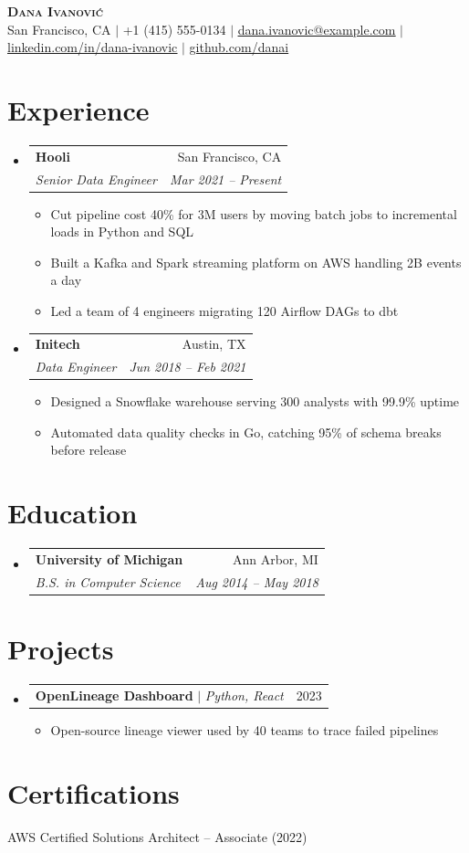 \documentclass[letterpaper,11pt]{article}
\makeatletter
\newcommand{\resumeItem}[1]{\item\small{{#1 \vspace{-2pt}}}}
\newcommand{\resumeSubheading}[4]{
  \vspace{-2pt}\item
    \begin{tabular*}{0.97\textwidth}[t]{l@{\extracolsep{\fill}}r}
      \textbf{#1} & #2 \\
      \textit{\small#3} & \textit{\small #4} \\
    \end{tabular*}\vspace{-7pt}
}
\newcommand{\resumeProjectHeading}[2]{
    \item
    \begin{tabular*}{0.97\textwidth}{l@{\extracolsep{\fill}}r}
      \small#1 & #2 \\
    \end{tabular*}\vspace{-7pt}
}
\newcommand{\resumeSubHeadingListStart}{\begin{itemize}[leftmargin=0.15in, label={}]}
\newcommand{\resumeSubHeadingListEnd}{\end{itemize}}
\newcommand{\resumeItemListStart}{\begin{itemize}}
\newcommand{\resumeItemListEnd}{\end{itemize}\vspace{-5pt}}
\makeatother
\begin{document}
\begin{center}
    \textbf{\Huge \scshape Dana Ivanovi\'{c}} \\ \vspace{1pt}
    \small San Francisco, CA $|$ +1 (415) 555-0134 $|$ \href{mailto:dana.ivanovic@example.com}{\underline{dana.ivanovic@example.com}} $|$
    \href{https://linkedin.com/in/dana-ivanovic}{\underline{linkedin.com/in/dana-ivanovic}} $|$
    \href{https://github.com/danai}{\underline{github.com/danai}}
\end{center}

\section{Experience}
  \resumeSubHeadingListStart
    \resumeSubheading
      {Hooli}{San Francisco, CA}
      {Senior Data Engineer}{Mar 2021 -- Present}
      \resumeItemListStart
        \resumeItem{Cut pipeline cost 40\% for 3M users by moving batch jobs to incremental loads in Python and SQL}
        \resumeItem{Built a Kafka and Spark streaming platform on AWS handling 2B events a day}
        \resumeItem{Led a team of 4 engineers migrating 120 Airflow DAGs to dbt}
      \resumeItemListEnd
    \resumeSubheading
      {Initech}{Austin, TX}
      {Data Engineer}{Jun 2018 -- Feb 2021}
      \resumeItemListStart
        \resumeItem{Designed a Snowflake warehouse serving 300 analysts with 99.9\% uptime}
        \resumeItem{Automated data quality checks in Go, catching 95\% of schema breaks before release}
      \resumeItemListEnd
  \resumeSubHeadingListEnd

\section{Education}
  \resumeSubHeadingListStart
    \resumeSubheading
      {University of Michigan}{Ann Arbor, MI}
      {B.S. in Computer Science}{Aug 2014 -- May 2018}
  \resumeSubHeadingListEnd

\section{Projects}
    \resumeSubHeadingListStart
      \resumeProjectHeading
          {\textbf{OpenLineage Dashboard} $|$ \emph{Python, React}}{2023}
          \resumeItemListStart
            \resumeItem{Open-source lineage viewer used by 40 teams to trace failed pipelines}
          \resumeItemListEnd
    \resumeSubHeadingListEnd

\section{Certifications}
 \begin{itemize}[leftmargin=0.15in, label={}]
    \small{\item{AWS Certified Solutions Architect -- Associate (2022)}}
 \end{itemize}
\end{document}
